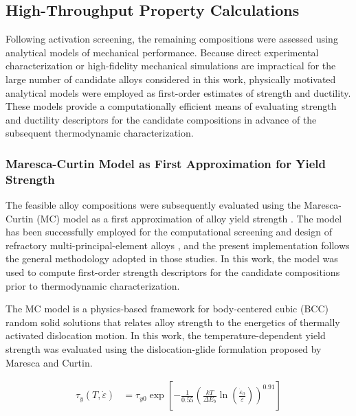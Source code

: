 \subsection{High-Throughput Property Calculations}

Following activation screening, the remaining compositions were assessed using
analytical models of mechanical performance. Because direct experimental
characterization or high-fidelity mechanical simulations are impractical for the
large number of candidate alloys considered in this work, physically motivated
analytical models were employed as first-order estimates of strength and
ductility. These models provide a computationally efficient means of evaluating
strength and ductility descriptors for the candidate compositions in advance of the
subsequent thermodynamic characterization.

\subsubsection{Maresca-Curtin Model as First Approximation for Yield Strength}

The feasible alloy compositions were subsequently evaluated using the Maresca-Curtin (MC) model as a first approximation of alloy yield strength \cite{maresca2020mechanistic}. The model has been successfully employed for the computational screening and design of refractory multi-principal-element alloys \cite{vela2023data}, and the present implementation follows the general methodology adopted in those studies. In this work, the model was used to compute first-order strength descriptors for the candidate compositions prior to thermodynamic characterization.

The MC model is a physics-based framework for body-centered cubic (BCC) random solid solutions that relates alloy strength to the energetics of thermally activated dislocation motion. In this work, the temperature-dependent yield strength was evaluated using the dislocation-glide formulation proposed by Maresca and Curtin.

\vspace{0.5em}

\begin{equation}
\begin{aligned}
\tau_y(T,\dot{\varepsilon})
&= \tau_{y0}
\exp\!\left[
-\frac{1}{0.55}
\left(
\frac{kT}{\Delta E_b}
\ln\!\left(\frac{\dot{\varepsilon}_0}{\dot{\varepsilon}}\right)
\right)^{0.91}
\right]
\end{aligned}
\label{eq:yield_stress}
\end{equation}


